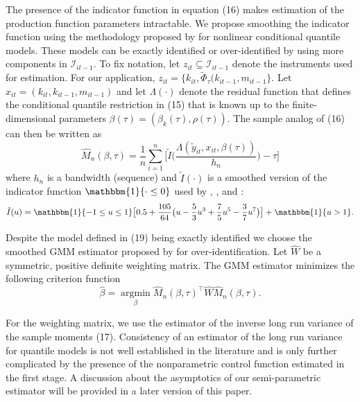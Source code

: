 \documentclass[11pt]{article}
\begin{document}
The presence of the indicator function in equation (16) makes estimation of the production function parameters intractable. We propose smoothing the indicator function using the methodology proposed by \cite*{qgmm} for nonlinear conditional quantile models. These models can be exactly identified or over-identified by using more components in $\mathcal{I}_{it-1}$. To fix notation, let $z_{it}\subseteq \mathcal{I}_{it-1}$ denote the instruments used for estimation. For our application, $z_{it}=\{k_{it}, \tilde{\Phi}_{\tau}(k_{it-1}, m_{it-1}\}$. Let $x_{it}=(k_{it}, k_{it-1}, m_{it-1})$ and let $\Lambda(\cdot)$ denote the residual function that defines the conditional quantile restriction in (15) that is known up to the finite-dimensional parameters $\beta(\tau)=(\beta_{k}(\tau), \rho(\tau))$. The sample analog of (16) can then be written as
\begin{equation}
    \hat{M}_{n}(\beta, \tau)=\frac{1}{n}\sum_{i=1}^{n}\Bigg[\tilde{I}\Bigg(\frac{\Lambda(\tilde{y}_{it}, x_{it}, \beta(\tau))}{h_{n}}\Bigg)-\tau\Bigg]
\end{equation}
where $h_{n}$ is a bandwidth (sequence) and $\tilde{I}(\cdot)$ is a smoothed version of the indicator function $\mathbbm{1}\{\cdot \leq 0\}$ used by \cite{Horowitz1998}, \cite{Whang2006}, and \cite{Kaplan2016}:
\begin{equation}
    \tilde{I}(u)=\mathbbm{1}\{-1\leq u \leq 1\}\big[0.5+\frac{105}{64}\big(u-\frac{5}{3}u^{3}+\frac{7}{5}u^{5}- \frac{3}{7}u^{7}\big)\big]+\mathbbm{1}\{u>1\}.
\end{equation}

Despite the model defined in (19) being exactly identified we choose the smoothed GMM estimator proposed by \cite{qgmm} for over-identification. Let $\hat{W}$ be a symmetric, positive definite weighting matrix. The GMM estimator minimizes the following criterion function
\begin{equation}
\hat{\beta}=\underset{\beta}{\operatorname{argmin}}\hat{M}_{n}(\beta, \tau)^{\top}\hat{W}\hat{M}_{n}(\beta, \tau).
\end{equation}

For the weighting matrix, we use the estimator of the inverse long run variance of the sample moments (17). Consistency of an estimator of the long run variance for quantile models is not well established in the literature and is only further complicated by the presence of the nonparametric control function estimated in the first stage. A discussion about the asymptotics of our semi-parametric estimator will be provided in a later version of this paper.
\end{document}
